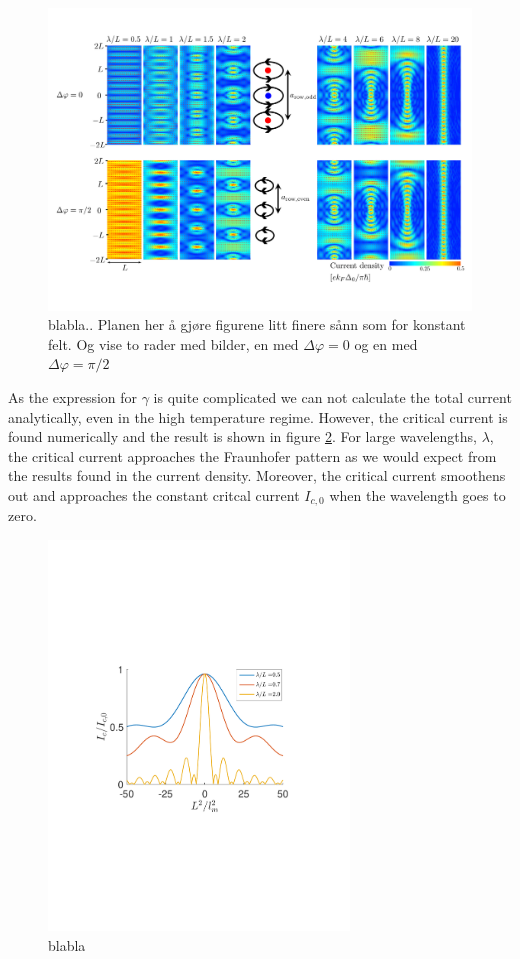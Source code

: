 \begin{figure}[hhh]
\centering
\includegraphics[width=17cm,clip=true,trim = 0cm 3.5cm 0cm 3cm]{fig/Dist3}
\caption{blabla.. Planen her å gjøre figurene litt finere sånn som for konstant felt. Og vise to rader med bilder, en med $\Delta \varphi = 0$ og en med $\Delta \varphi = \pi/2$}
\label{fig:Dist3}
\end{figure}
As the expression for $\gamma$ is quite complicated we can not calculate the total current analytically, even in the high temperature regime. However, the critical current is found numerically and the result is shown in figure \ref{fig:Critical2}. For large wavelengths, $\lambda$, the critical current approaches the Fraunhofer pattern as we would expect from the results found in the current density. Moreover, the critical current smoothens out and approaches the constant critcal current $I_{c,0}$ when the wavelength goes to zero.
\begin{figure}[hhh]
\centering
\includegraphics[width=8cm,clip=true,trim=3cm 8cm 4cm 9cm]{fig/Critical2}
\caption{blabla}
\label{fig:Critical2}
\end{figure}


